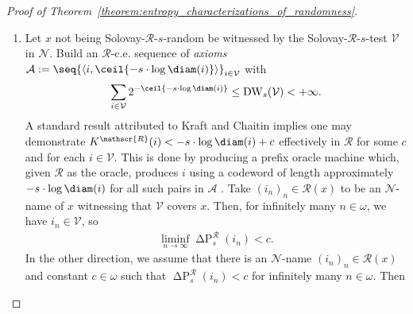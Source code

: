 \begin{proof}[Proof of Theorem~\ref{theorem:entropy_characterizations_of_randomness}]
\begin{enumerate}[label = (\roman*)]
        In the other direction, define for each $n \in \omega$ the $\mathscr{R}$-c.e. set:
        \begin{align*}
            U_n := \set{i \in \omega}{\Delta \operatorname{P}^{\mathscr{R}}_s(i) \leq - n}.
        \end{align*}
        We assume that there is some $\mathcal{N}$-name $(i_n)_n \in \mathcal{R}(x)$ for which no constant $c$ satisfies $\Delta \operatorname{P}^{\mathscr{R}}_s(i_n) \geq c$. We may refine $(i_n)_n$ that to an $\mathcal{N}$-name of $x$ such that $\Delta \operatorname{P}^{\mathscr{R}}_s(i_n) \leq - n$. That is, $\mathcal{U} = (U_n)_n$ covers $x$. We confirm that $\mathcal{U}$ is an ML-$\mathscr{R}$-$s$-test by bounding the direct $s$-weights and applying the Kraft Inequality~\ref{theorem:kraft_inequality}: 
        \begin{align*}
            \operatorname{DW}_s(U_n) = \sum_{i \in U_n} \diam(i)^s \leq \sum_{i \in U_n} 2^{-K^{\mathscr{R}}(i) - n} = 2^{-n} \sum_i 2^{-K^{\mathscr{R}}(i)} \leq 2^{-n}.
        \end{align*}
        Thus, $x$ is not ML-$\mathscr{R}$-$s$-random.
        \item Let $x$ not being Solovay-$\mathscr{R}$-$s$-random be witnessed by the Solovay-$\mathscr{R}$-$s$-test $\mathcal{V}$ in $\mathcal{N}$. Build an $\mathscr{R}$-c.e. sequence of \textit{axioms} $\mathcal{A} := \seq{\langle i, \ceil{- s \cdot \log \diam(i)} \rangle}_{i \in \mathcal{V}}$ with 
        \begin{align*}
            \sum_{i \in \mathcal{V}} 2^{- \ceil{- s \cdot \log \diam(i)}} \leq \operatorname{DW}_s(\mathcal{V}) < +\infty.
        \end{align*} 
        A standard result attributed to Kraft and Chaitin implies one may demonstrate $K^{\mathscr{R}}(i) < - s \cdot \log \diam(i) + c$ effectively in $\mathscr{R}$ for some $c$ and for each $i \in \mathcal{V}$. This is done by producing a prefix oracle machine which, given $\mathscr{R}$ as the oracle, produces $i$ using a codeword of length approximately $- s \cdot \log \diam(i)$ for all such pairs in $\mathcal{A}$ \cite{LV08}. Take $(i_n)_n \in \mathcal{R}(x)$ to be an $\mathcal{N}$-name of $x$ witnessing that $\mathcal{V}$ covers $x$. Then, for infinitely many $n \in \omega$, we have $i_n \in \mathcal{V}$, so
        \begin{align*}
            \liminf_{n \to \infty} \operatorname{\Delta P}^{\mathscr{R}}_s(i_n) < c.
        \end{align*}
        In the other direction, we assume that there is an $\mathcal{N}$-name $(i_n)_n \in \mathcal{R}(x)$ and constant $c \in \omega$ such that $\operatorname{\Delta P}^{\mathscr{R}}_s(i_n) < c$ for infinitely many $n \in \omega$. Then 

\end{enumerate}
\end{proof}
